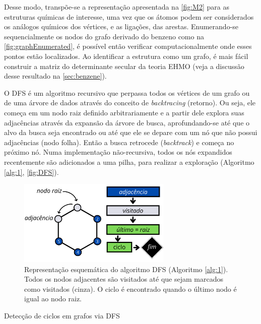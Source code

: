 Desse modo, transpõe-se a representação apresentada na \autoref{fig:M2} para as estruturas químicas de interesse, uma vez que os átomos podem ser considerados os análogos químicos dos vértices, e as ligações, das arestas. Enumerando-se sequencialmente os nodos do grafo derivado do benzeno como na \autoref{fig:graphEnumerated}, é possível então verificar computacionalmente onde esses pontos estão localizados. Ao identificar a estrutura como um grafo, é mais fácil construir a matriz do determinante secular da teoria \gls{EHMO} (veja a discussão desse resultado na \autoref{sec:benzene}). 

O \gls{DFS}\autocite{Knuth1997-jf, Goodrich2001-pd} é um algoritmo recursivo que perpassa todos os vértices de um grafo ou de uma árvore de dados através do conceito de \textit{backtracing} (retorno). Ou seja, ele começa em um nodo raiz definido arbitrariamente e a partir dele explora suas adjacências através da expansão da árvore de busca, aprofundando-se até que o alvo da busca seja encontrado ou até que ele se depare com um nó que não possui adjacências (nodo folha). Então a busca retrocede (\textit{backtrack}) e começa no próximo nó. Numa implementação não-recursiva, todos os nós expandidos recentemente são adicionados a uma pilha, para realizar a exploração (Algoritmo \ref{alg:1}, \autoref{fig:DFS}).

\begin{figure}[htb]
\caption{\label{fig:DFS} Representação esquemática do algoritmo DFS (Algoritmo \ref{alg:1}). Todos os nodos adjacentes são visitados até que sejam marcados como visitados (cinza). O ciclo é encontrado quando o último nodo é igual ao nodo raiz.}
	\begin{center}
		\includegraphics[width=0.65\textwidth]{images/DFS.png}
	\end{center}
\end{figure}


\begin{algorithm}
\caption{Detecção de ciclos em grafos via DFS}\label{alg:1}
\LinesNumbered
{}

\end{algorithm}

